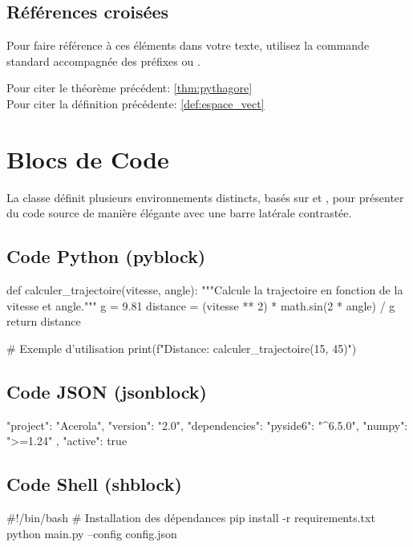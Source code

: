 \documentclass[theme=acerola]{myrtille}
\begin{document}
\subsection{Références croisées}
Pour faire référence à ces éléments dans votre texte, utilisez la commande standard  accompagnée des préfixes  ou .

Pour citer le théorème précédent: \ref{thm:pythagore}\\
Pour citer la définition précédente: \ref{def:espace_vect}

\section{Blocs de Code}
La classe définit plusieurs environnements distincts, basés sur  et , pour présenter du code source de manière élégante avec une barre latérale contrastée.

\subsection{Code Python (pyblock)}
\begin{pyblock}
def calculer_trajectoire(vitesse, angle):
    """Calcule la trajectoire en fonction de la vitesse et angle."""
    g = 9.81
    distance = (vitesse ** 2) * math.sin(2 * angle) / g
    return distance

# Exemple d'utilisation
print(f"Distance: {calculer_trajectoire(15, 45)}")
\end{pyblock}

\subsection{Code JSON (jsonblock)}
\begin{jsonblock}
{
  "project": "Acerola",
  "version": "2.0",
  "dependencies": {
    "pyside6": "^6.5.0",
    "numpy": ">=1.24"
  },
  "active": true
}
\end{jsonblock}

\subsection{Code Shell (shblock)}
\begin{shblock}
#!/bin/bash
# Installation des dépendances
pip install -r requirements.txt
python main.py --config config.json
\end{shblock}
\end{document}
